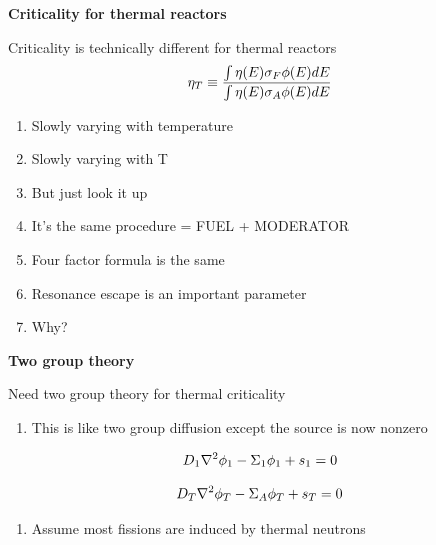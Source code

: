 \documentclass[aspectratio=1610,pdftex,dvipsnames,compress,xcolor={dvipsnames}]{beamer}
\begin{document}
\begin{frame}[plain]{}
    \centering\LARGE\textbf{Criticality for thermal reactors}
\end{frame}


\addtocounter{framenumber}{-1} 
\begin{frame}{Criticality is technically different for thermal reactors}
    \begin{equation}
       \LARGE
        \eta_T \equiv \frac{\int \eta(E) \sigma_F \phi(E) dE}{\int \eta(E) \sigma_A \phi(E) dE}
    \end{equation}

    \vspace*{\fill}

    \begin{enumerate}[series=outerlist,topsep=0pt,itemsep=11pt,leftmargin=*,label=(\arabic*)]
        \item[]Slowly varying with temperature
        \item[]Slowly varying with T
        \item[]But just look it up
        \item[]It's the same procedure = FUEL + MODERATOR
        \item[]Four factor formula is the same
        \item[]Resonance escape is an important parameter
        \item[]Why?
    \end{enumerate}
\end{frame}


\begin{frame}[plain]{}
    \centering\LARGE\textbf{Two group theory}
\end{frame}


\addtocounter{framenumber}{-1} 
\begin{frame}{Need two group theory for thermal criticality}
    \begin{enumerate}[series=outerlist,topsep=0pt,itemsep=11pt,leftmargin=*,label=(\arabic*)]
        \item[]This is like two group diffusion except the source is now nonzero
    \end{enumerate}

    \vspace*{\fill}

    \begin{equation}
        \LARGE
        D_1 \nabla^2 \phi_1 -\Sigma_1 \phi_1 + s_1=0
    \end{equation}

    \begin{equation}
        \LARGE
        D_T \nabla^2 \phi_T -\Sigma_A \phi_T + s_T=0
    \end{equation}

    \vspace*{\fill}

    \begin{enumerate}[series=outerlist,topsep=0pt,itemsep=11pt,leftmargin=*,label=(\arabic*)]
        \item[]Assume most fissions are induced by thermal neutrons
    \end{enumerate}
\end{frame}
\end{document}
